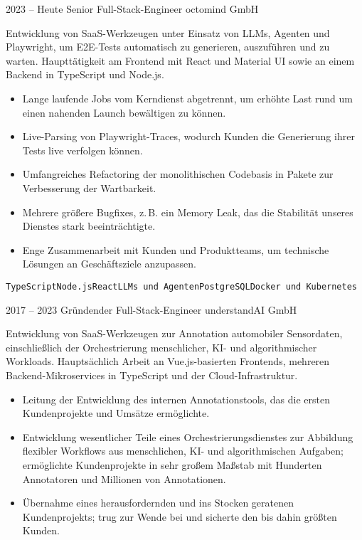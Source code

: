 \documentclass[8pt]{developercv} %
\newcommand{\linebreaksmall}{\vspace{2mm}}
\begin{document}
\begin{entrylist}
	\entry
		{2023 -- Heute}
		{Senior Full-Stack-Engineer}
		{octomind GmbH}
		{Entwicklung von SaaS-Werkzeugen unter Einsatz von LLMs, Agenten und Playwright, um E2E-Tests automatisch zu generieren, auszuführen und zu warten. Haupttätigkeit am Frontend mit React und Material UI sowie an einem Backend in TypeScript und Node.js.
		\begin{itemize}[nosep, topsep=0pt, left=5pt, after=\vspace{6pt}]
			\item Lange laufende Jobs vom Kerndienst abgetrennt, um erhöhte Last rund um einen nahenden Launch bewältigen zu können.
			\item Live-Parsing von Playwright-Traces, wodurch Kunden die Generierung ihrer Tests live verfolgen können.
			\item Umfangreiches Refactoring der monolithischen Codebasis in Pakete zur Verbesserung der Wartbarkeit.
			\item Mehrere größere Bugfixes, z.\,B. ein Memory Leak, das die Stabilität unseres Dienstes stark beeinträchtigte.
			\item Enge Zusammenarbeit mit Kunden und Produktteams, um technische Lösungen an Geschäftsziele anzupassen.
		\end{itemize}
		\texttt{TypeScript}\slashsep\texttt{Node.js}\slashsep\texttt{React}\slashsep\texttt{LLMs und Agenten}\slashsep\texttt{PostgreSQL}\slashsep\texttt{Docker und Kubernetes}} \linebreaksmall
	\entry
		{2017 -- 2023}
		{Gründender Full-Stack-Engineer}
		{understandAI GmbH}
		{Entwicklung von SaaS-Werkzeugen zur Annotation automobiler Sensordaten, einschließlich der Orchestrierung menschlicher, KI- und algorithmischer Workloads. Hauptsächlich Arbeit an Vue.js-basierten Frontends, mehreren Backend-Mikroservices in TypeScript und der Cloud-Infrastruktur.
		\begin{itemize}[nosep, topsep=0pt, left=5pt, after=\vspace{6pt}]
			\item Leitung der Entwicklung des internen Annotationstools, das die ersten Kundenprojekte und Umsätze ermöglichte.
			\item Entwicklung wesentlicher Teile eines Orchestrierungsdienstes zur Abbildung flexibler Workflows aus menschlichen, KI- und algorithmischen Aufgaben; ermöglichte Kundenprojekte in sehr großem Maßstab mit Hunderten Annotatoren und Millionen von Annotationen.
			\item Übernahme eines herausfordernden und ins Stocken geratenen Kundenprojekts; trug zur Wende bei und sicherte den bis dahin größten Kunden.

\end{itemize}}
\end{entrylist}
\end{document}
